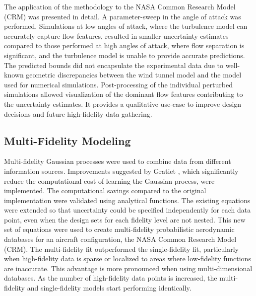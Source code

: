 The application of the methodology to the NASA Common Research Model (CRM) was presented in detail.
A parameter-sweep in the angle of attack was performed.
Simulations at low angles of attack, where the turbulence model can accurately capture flow features, resulted in smaller uncertainty estimates compared to those performed at high angles of attack, where flow separation is significant, and the turbulence model is unable to provide accurate predictions.
The predicted bounds did not encapsulate the experimental data due to well-known geometric discrepancies between the wind tunnel model and the model used for numerical simulations.
Post-processing of the individual perturbed simulations allowed visualization of the dominant flow features contributing to the uncertainty estimates.
It provides a qualitative use-case to improve design decisions and future high-fidelity data gathering.

\subsection{Multi-Fidelity Modeling}

Multi-fidelity Gaussian processes were used to combine data from different information sources.
Improvements suggested by Gratiet \cite{gratiet_multi-fidelity_nodate}, which significantly reduce the computational cost of learning the Gaussian process, were implemented.
The computational savings compared to the original implementation \cite{kennedy_predicting_2000} were validated using analytical functions. 
The existing equations were extended so that uncertainty could be specified independently for each data point, even when the design sets for each fidelity level are not nested.
This new set of equations were used to create multi-fidelity probabilistic aerodynamic databases for an aircraft configuration, the NASA Common Research Model (CRM).
The multi-fidelity fit outperformed the single-fidelity fit, particularly when high-fidelity data is sparse or localized to areas where low-fidelity functions are inaccurate.
This advantage is more pronounced when using multi-dimensional databases.
As the number of high-fidelity data points is increased, the multi-fidelity and single-fidelity models start performing identically.

